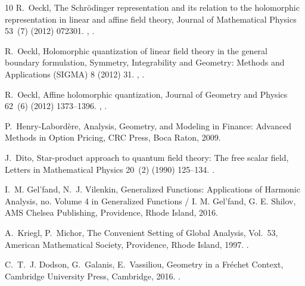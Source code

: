 \documentclass{elsarticle}%
\begin{document}
\begin{thebibliography}{10}
    R.~Oeckl, The {{Schr{\"o}dinger}} representation and its relation to the holomorphic representation in linear and affine field theory, Journal of Mathematical Physics 53~(7) (2012) 072301.
    \newblock \href {http://arxiv.org/abs/1109.5215} {}, \href {https://doi.org/10.1063/1.4731770} {}.
    
    R.~Oeckl, Holomorphic quantization of linear field theory in the general boundary formulation, Symmetry, Integrability and Geometry: Methods and Applications (SIGMA) 8 (2012) 31.
    \newblock \href {http://arxiv.org/abs/1009.5615} {}, \href {https://doi.org/10.3842/SIGMA.2012.050} {}.
    
    R.~Oeckl, Affine holomorphic quantization, Journal of Geometry and Physics 62~(6) (2012) 1373--1396.
    \newblock \href {http://arxiv.org/abs/1104.5527} {}, \href {https://doi.org/10.1016/j.geomphys.2012.02.001} {}.
    
    P.~{Henry-Labord{\`e}re}, Analysis, Geometry, and Modeling in Finance: Advanced Methods in Option Pricing, CRC Press, Boca Raton, 2009.
    
    J.~Dito, Star-product approach to quantum field theory: {{The}} free scalar field, Letters in Mathematical Physics 20~(2) (1990) 125--134.
    \newblock \href {https://doi.org/10.1007/BF00398277} {}.
    
    I.~M. Gel'fand, N.~J. Vilenkin, Generalized {{Functions}}: {{Applications}} of Harmonic Analysis, no. Volume 4 in Generalized Functions / {{I}}. {{M}}. {{Gel}}'fand, {{G}}. {{E}}. {{Shilov}}, AMS Chelsea Publishing, Providence, Rhode Island, 2016.
    
    A.~Kriegl, P.~Michor, The {{Convenient Setting}} of {{Global Analysis}}, Vol.~53, American Mathematical Society, Providence, Rhode Island, 1997.
    \newblock \href {https://doi.org/10.1090/surv/053} {}.
    
    C.~T.~J. Dodson, G.~Galanis, E.~Vassiliou, Geometry in a {{Fr{\'e}chet Context}}, Cambridge University Press, Cambridge, 2016.
    \newblock \href {https://doi.org/10.1017/CBO9781316556092} {}.
    

\end{thebibliography}
\end{document}
